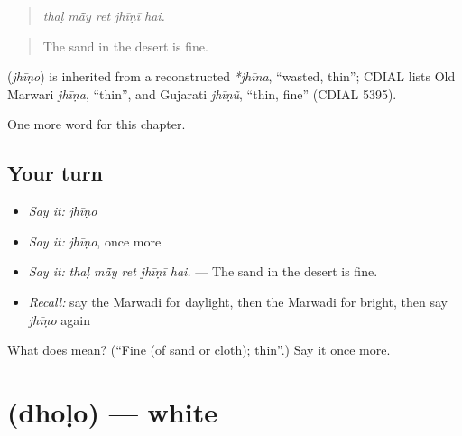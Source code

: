 \begin{quote}
    
\end{quote}

\begin{quote}
\emph{thaḷ mā̃y ret jhīṇī hai.}
\end{quote}

\begin{quote}
The sand in the desert is fine.
\end{quote}

\begin{cousinweb}
\textbf{} (\emph{jhīṇo}) is inherited from a reconstructed \emph{*jhīna}, \textquotedblleft{}wasted, thin\textquotedblright{}; CDIAL lists Old Marwari \emph{jhīṇa}, \textquotedblleft{}thin\textquotedblright{}, and Gujarati \emph{jhīṇũ}, \textquotedblleft{}thin, fine\textquotedblright{} (CDIAL 5395).
\end{cousinweb}

\begin{grammarlens}[title={What you've built}]
One more word for this chapter.
\end{grammarlens}

\subsection*{Your turn}
\begin{itemize}
\raggedright
  \item \emph{Say it:} \emph{jhīṇo}
  \item \emph{Say it:} \emph{jhīṇo}, once more
  \item \emph{Say it:} \emph{thaḷ mā̃y ret jhīṇī hai.} — The sand in the desert is fine.
  \item \emph{Recall:} say the Marwadi for daylight, then the Marwadi for bright, then say \emph{jhīṇo} again
\end{itemize}

\begin{tcolorbox}[breakable,colback=teal!4,colframe=teal!35!black,title={Before you move on}]
What does  mean? (\textquotedblleft{}Fine (of sand or cloth); thin\textquotedblright{}.) Say it once more.
\end{tcolorbox}
\section[\texorpdfstring{\mw{धोळो} (dhoḷo)}{धोळो (dhoḷo)}]{ (dhoḷo) — white}


